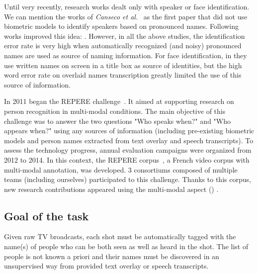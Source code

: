 \documentclass{acm_proc_article-me}
\begin{document}
Until very recently, research works dealt only with speaker or face identification. We can mention the works of \textit{Canseco et al.}~\cite{CANSECO--ASRU--2005, CANSECO--INTERSPEECH--2004} as the first paper that did not use biometric models to identify speakers based on pronounced names. Following works improved this idea: \cite{ESTEVE--INTERSPEECH--2007, JOUSSE--ICCASP--2009, MAUCLAIR--Odyssey--2006, TRANTER--ICASSP--2006}. However, in all the above studies, the identification error rate is very high when automatically recognized (and noisy) pronounced names are used as source of naming information. For face identification, in \cite{HOUGHTON--IS--1999, SATOH--IEEEMM--1999, YANG--ACMMM--2004, YANG--ACMMM--2005} they use written names on screen in a title box as source of identities, but the high word error rate on overlaid names transcription greatly limited the use of this source of information.

In 2011 began the REPERE challenge~\cite{BERNARD--SLAM--2013, KAHN--CBMI--2012}. It aimed at supporting research on person recognition in multi-modal conditions. The main objective of this challenge was to answer the two questions "Who speaks when?" and "Who appears when?" using any sources of information (including pre-existing biometric models and person names extracted from text overlay and speech transcripts). To assess the technology progress, annual evaluation campaigns were organized from 2012 to 2014. In this context, the REPERE corpus~\cite{GIRAUDEL--LREC--2012}, a French video corpus with multi-modal annotation, was developed. 3 consortiums composed of multiple teams (including ourselves) participated to this challenge. Thanks to this corpus, new research contributions appeared using the multi-modal aspect (\cite{BECHET--INTERSPEECH--2014, BENDRIS--CBMI--2013, BREDIN--ODYSSEY--2014, BREDIN--INTERSPEECH--2013, BREDIN--SLAM--2013, BREDIN--IJMIR--2014, FAVRE--SLAM--2013, GAY--CBMI--2014, POIGNANT--ASLP--2015, POIGNANT--SLAM--2013, POIGNANT--INTERSPEECH--2012, POIGNANT--MTAP--2015, ROUVIER--CBMI--2014})  . 

\subsection{Goal of the task}

Given raw TV broadcasts, each shot must be automatically tagged with the name(s) of people who can be both seen as well as heard in the shot. The list of people is not known a priori and their names must be discovered in an unsupervised way from provided text overlay or speech transcripts. 
\end{document}

